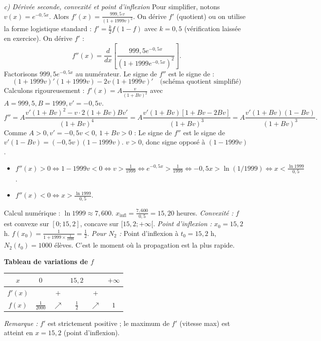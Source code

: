 \documentclass[11pt]{article}
\begin{document}
\begin{exoresolu}
\medskip
\noindent \textit{c) Dérivée seconde, convexité et point d'inflexion}
Pour simplifier, notons $v(x) = e^{-0,5 x}$. Alors $f'(x) = \frac{999,5 \, v}{(1+1999 v)^2}$.
On dérive $f'$ (quotient) ou on utilise la forme logistique standard : $f' = \frac{k}{2} f (1-f)$ avec $k=0,5$ (vérification laissée en exercice).
On dérive $f'$ :
\[
f''(x) = \frac{d}{dx} \left[ \frac{999,5 e^{-0,5 x}}{(1+1999 e^{-0,5 x})^2} \right].
\]
Factorisons $999,5 e^{-0,5 x}$ au numérateur. Le signe de $f''$ est le signe de :
\[
(1+1999 v)' (1+1999 v) - 2 v (1+1999 v)' \quad \text{(schéma quotient simplifié)}
\]
Calculons rigoureusement :
$f'(x) = A \frac{v}{(1+B v)^2}$ avec $A=999,5, B=1999, v' = -0,5 v$.
\[
f'' = A \frac{v'(1+Bv)^2 - v \cdot 2(1+Bv) B v'}{(1+Bv)^4} = A \frac{v'(1+Bv) [1+Bv - 2Bv]}{(1+Bv)^3} = A \frac{v'(1+Bv)(1 - Bv)}{(1+Bv)^3}.
\]
Comme $A>0, v' = -0,5v < 0$, $1+Bv > 0$ :
Le signe de $f''$ est le signe de $v'(1 - Bv) = (-0,5v)(1 - 1999v)$.
$v>0$, donc signe opposé à $(1 - 1999v)$.
\begin{itemize}
    \item $f''(x) > 0 \iff 1 - 1999v < 0 \iff v > \frac{1}{1999} \iff e^{-0,5x} > \frac{1}{1999} \iff -0,5x > \ln(1/1999) \iff x < \frac{\ln 1999}{0,5}$.
    \item $f''(x) < 0 \iff x > \frac{\ln 1999}{0,5}$.
\end{itemize}
Calcul numérique : $\ln 1999 \approx 7,600$. $x_{\text{infl}} = \frac{7,600}{0,5} = 15,20$ heures.
\emph{Convexité :} $f$ est convexe sur $[0; 15,2]$, concave sur $[15,2; +\infty[$.
\emph{Point d'inflexion :} $x_0 = 15,2$ h. $f(x_0) = \frac{1}{1+1999 \times \frac{1}{1999}} = \frac{1}{2}$.
\emph{Pour $N_2$ :} Point d'inflexion à $t_0 = 15,2$ h, $N_2(t_0) = 1000$ élèves. C'est le moment où la propagation est la plus rapide.

\medskip
\noindent \textbf{Tableau de variations de $f$}
\begin{center}
\begin{tabular}{|c|ccccc|}\hline
$x$ & $0$ & & $15,2$ & & $+\infty$ \\ \hline
$f'(x)$ & & $+$ & & $+$ & \\ \hline
$f(x)$ & $\frac{1}{2000}$ & $\nearrow$ & $\frac{1}{2}$ & $\nearrow$ & $1$ \\ \hline
\end{tabular}
\end{center}
\emph{Remarque :} $f'$ est strictement positive ; le maximum de $f'$ (vitesse max) est atteint en $x=15,2$ (point d'inflexion).


\end{exoresolu}
\end{document}
